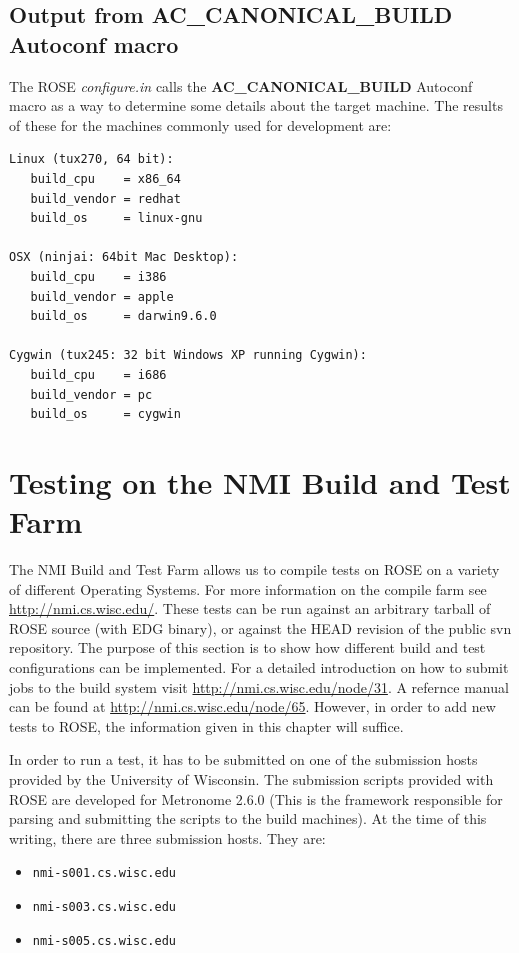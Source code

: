 \subsection{Output from {\bf AC\_CANONICAL\_BUILD} Autoconf macro}

   The ROSE {\em configure.in} calls the {\bf AC\_CANONICAL\_BUILD} Autoconf 
macro as a way to determine some details about the target machine.  The
results of these for the machines commonly used for development are:
\begin{verbatim}
Linux (tux270, 64 bit):
   build_cpu    = x86_64
   build_vendor = redhat
   build_os     = linux-gnu

OSX (ninjai: 64bit Mac Desktop):
   build_cpu    = i386
   build_vendor = apple
   build_os     = darwin9.6.0

Cygwin (tux245: 32 bit Windows XP running Cygwin):
   build_cpu    = i686
   build_vendor = pc
   build_os     = cygwin
\end{verbatim}

\section{Testing on the NMI Build and Test Farm}%

The NMI Build and Test Farm allows us to compile tests on ROSE on a variety of
different Operating Systems. For more information on the compile farm see
\url{http://nmi.cs.wisc.edu/}.  These tests can be run against an arbitrary
tarball of ROSE source (with EDG binary), or against the HEAD revision of the
public svn repository.  The purpose of this section is to show how different
build and test configurations can be implemented.  For a detailed introduction
on how to submit jobs to the build system visit
\url{http://nmi.cs.wisc.edu/node/31}. A refernce manual can be found at
\url{http://nmi.cs.wisc.edu/node/65}. However, in order to add new tests to
ROSE, the information given in this chapter will suffice.

In order to run a test, it has to be submitted on one of the submission hosts
provided by the University of Wisconsin.
The submission scripts provided with ROSE are developed for Metronome 2.6.0
(This is the framework responsible for parsing and submitting the scripts to the
build machines). At the time of this writing, there are three submission hosts.
They are:
\begin{itemize}
    \item {\tt nmi-s001.cs.wisc.edu}
    \item {\tt nmi-s003.cs.wisc.edu}
    \item {\tt nmi-s005.cs.wisc.edu}
\end{itemize}

